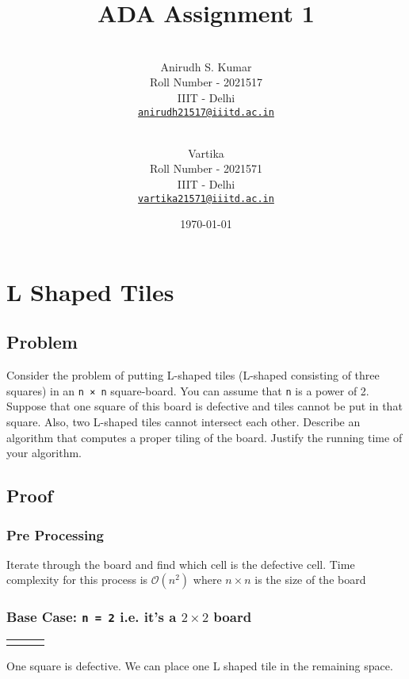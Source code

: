 \documentclass[12pt]{article}
\title{ADA Assignment 1}
\author{
    \\\vspace{0em} Anirudh S. Kumar \\\vspace{-0.5em}
    \footnotesize{Roll Number - 2021517}\\\vspace{-0.5em}
    \footnotesize{IIIT - Delhi}\\\vspace{-0.5em}
    \footnotesize{\href{mailto:anirudh21517@iiitd.ac.in}{\texttt{anirudh21517@iiitd.ac.in}}}
  \and
    \\\vspace{0em} Vartika\\\vspace{-0.5em}
    \footnotesize{Roll Number - 2021571}\\\vspace{-0.5em}
    \footnotesize{IIIT - Delhi}\\\vspace{-0.5em}
    \footnotesize{\href{mailto:vartika21571@iiitd.ac.in}{\texttt{vartika21571@iiitd.ac.in}}} 
    \vspace{1em}
}
\date{\today}
\newenvironment{statement}{\color[rgb]{1.00,0.00,0.50} {}}{}
\begin{document}
\maketitle

\section{L Shaped Tiles}
\subsection{Problem}
\begin{statement}
Consider the problem of putting L-shaped tiles (L-shaped consisting of three squares)
in an \texttt{n × n} square-board. You can assume that \texttt{n} is a power of 2. Suppose that one square of this
board is defective and tiles cannot be put in that square. Also, two L-shaped tiles cannot intersect
each other. Describe an algorithm that computes a proper tiling of the board. Justify the running
time of your algorithm.
\end{statement}


\subsection{Proof}

\subsubsection{Pre Processing}

Iterate through the board and find which cell is the defective cell. Time complexity for this process is $\mathcal{O}(n^2)$ where $n \times n$ is the size of the board

\subsubsection{Base Case: \texttt{n = 2} i.e. it's a \texorpdfstring{$2 \times 2$}{Lg} board }

\begin{table}[ht]
\centering
\begin{tabular}{|M{20pt}|M{20pt}|N}
\hline
&  \\[20pt]
\hline
 &  \\[20pt]
\hline
\end{tabular}
\end{table}

One square is defective. We can place one L shaped tile in the remaining space.
\end{document}

